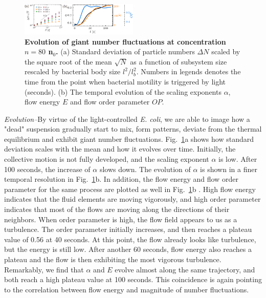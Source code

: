 \documentclass[twocolumn,aps,prl,amsmath,amssymb,longbibliography]{revtex4-2}
\begin{document}
\begin{figure}[ht]
\begin{center}
\includegraphics[width=0.5\textwidth]{figures/fig-4-v2.png}
\caption[]{\textbf{Evolution of giant number fluctuations at concentration $n=80$ n$_0$.} (a) Standard deviation of particle numbers $\Delta N$ scaled by the square root of the mean $\sqrt N$ as a function of subsystem size rescaled by bacterial body size $l^2/l_b^2$. Numbers in legends denotes the time from the point when bacterial motility is triggered by light (seconds). (b) The temporal evolution of the scaling exponents $\alpha$, flow energy $E$ and flow order parameter $OP$.}
\label{fig:4}
\end{center}
\end{figure}

\textit{Evolution--}By virtue of the light-controlled \textit{E. coli}, we are able to image how a "dead" suspension gradually start to mix, form patterns, deviate from the thermal equilibrium and exhibit giant number fluctuations. Fig.~\ref{fig:4}a shows how standard deviation scales with the mean and how it evolves over time. Initially, the collective motion is not fully developed, and the scaling exponent $\alpha$ is low. After 100 seconds, the increase of $\alpha$ slows down. The evolution of $\alpha$ is shown in a finer temporal resolution in Fig.~\ref{fig:4}b. In addition, the flow energy and flow order parameter for the same process are plotted as well in Fig.~\ref{fig:4}b \cite{Peng2020}. High flow energy indicates that the fluid elements are moving vigorously, and high order parameter indicates that most of the flows are moving along the directions of their neighbors. When order parameter is high, the flow field appears to us as a turbulence. The order parameter initially increases, and then reaches a plateau value of 0.56 at 40 seconds. At this point, the flow already looks like turbulence, but the energy is still low. After another 60 seconds, flow energy also reaches a plateau and the flow is then exhibiting the most vigorous turbulence. Remarkably, we find that $\alpha$ and $E$ evolve almost along the same trajectory, and both reach a high plateau value at 100 seconds. This coincidence is again pointing to the correlation between flow energy and magnitude of number fluctuations.
\end{document}
